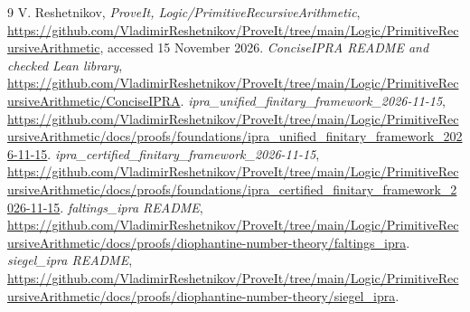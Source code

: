 \documentclass[11pt]{article}
\begin{document}
\begin{thebibliography}{9}
 V. Reshetnikov, \emph{ProveIt, Logic/PrimitiveRecursiveArithmetic}, \url{https://github.com/VladimirReshetnikov/ProveIt/tree/main/Logic/PrimitiveRecursiveArithmetic}, accessed 15 November 2026.
 \emph{ConciseIPRA README and checked Lean library}, \url{https://github.com/VladimirReshetnikov/ProveIt/tree/main/Logic/PrimitiveRecursiveArithmetic/ConciseIPRA}.
 \emph{ipra\_unified\_finitary\_framework\_2026-11-15}, \url{https://github.com/VladimirReshetnikov/ProveIt/tree/main/Logic/PrimitiveRecursiveArithmetic/docs/proofs/foundations/ipra_unified_finitary_framework_2026-11-15}.
 \emph{ipra\_certified\_finitary\_framework\_2026-11-15}, \url{https://github.com/VladimirReshetnikov/ProveIt/tree/main/Logic/PrimitiveRecursiveArithmetic/docs/proofs/foundations/ipra_certified_finitary_framework_2026-11-15}.
 \emph{faltings\_ipra README}, \url{https://github.com/VladimirReshetnikov/ProveIt/tree/main/Logic/PrimitiveRecursiveArithmetic/docs/proofs/diophantine-number-theory/faltings_ipra}.
 \emph{siegel\_ipra README}, \url{https://github.com/VladimirReshetnikov/ProveIt/tree/main/Logic/PrimitiveRecursiveArithmetic/docs/proofs/diophantine-number-theory/siegel_ipra}.
\end{thebibliography}
\end{document}
